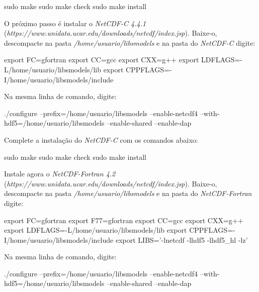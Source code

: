 \begin{bashcode}
sudo make
sudo make check
sudo make install
\end{bashcode}
\bigskip

\noindent O próximo passo é instalar o \textit{NetCDF-C 4.4.1} (\textcolor{bleu_cite}{\textit{https://www.unidata.ucar.edu/downloads/netcdf/index.jsp}}). Baixe-o, descompacte na pasta \textit{/home/usuario/libsmodels} e na pasta do \textit{NetCDF-C} digite:
\bigskip

\begin{bashcode}[fontsize=\scriptsize]
export FC=gfortran
export CC=gcc
export CXX=g++
export LDFLAGS=-L/home/usuario/libsmodels/lib
export CPPFLAGS=-I/home/usuario/libsmodels/include
\end{bashcode}
\bigskip

\noindent Na mesma linha de comando, digite:
\bigskip

\begin{bashcode}[fontsize=\scriptsize]
./configure --prefix=/home/usuario/libsmodels
--enable-netcdf4 --with-hdf5=/home/usuario/libsmodels --enable-shared --enable-dap
\end{bashcode}
\bigskip

\noindent Complete a instalação do \textit{NetCDF-C} com os comandos abaixo:
\bigskip

\begin{bashcode}
sudo make
sudo make check
sudo make install
\end{bashcode}
\bigskip

\noindent Instale agora o \textit{NetCDF-Fortran 4.2} (\textcolor{bleu_cite}{\textit{https://www.unidata.ucar.edu/downloads/netcdf/index.jsp}}). Baixe-o, descompacte na pasta \textit{/home/usuario/libsmodels} e na pasta do \textit{NetCDF-Fortran} digite:
\bigskip

\begin{bashcode}[fontsize=\scriptsize]
export FC=gfortran
export F77=gfortran
export CC=gcc
export CXX=g++
export LDFLAGS=-L/home/usuario/libsmodels/lib
export CPPFLAGS=-I/home/usuario/libsmodels/include
export LIBS='-lnetcdf -lhdf5 -lhdf5_hl -lz'
\end{bashcode}
\bigskip

\noindent Na mesma linha de comando, digite:
\bigskip

\begin{bashcode}
./configure --prefix=/home/usuario/libsmodels --enable-netcdf4
--with-hdf5=/home/usuario/libsmodels --enable-shared --enable-dap
\end{bashcode}
\bigskip

